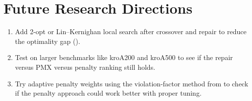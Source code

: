 \section{Future Research Directions}
\label{Conc:FutureWork}

\begin{enumerate}[nosep]
    \item Add 2-opt or Lin--Kernighan local search after crossover and
    repair to reduce the optimality gap (\cite{liu2014powerfulga}).

    \item Test on larger benchmarks like kroA200 and kroA500 to see if
    the repair versus PMX versus penalty ranking still holds.

    \item Try adaptive penalty weights using the violation-factor method
    from \cite{chehouri2016violationfactor} to check if the penalty
    approach could work better with proper tuning.
\end{enumerate}
